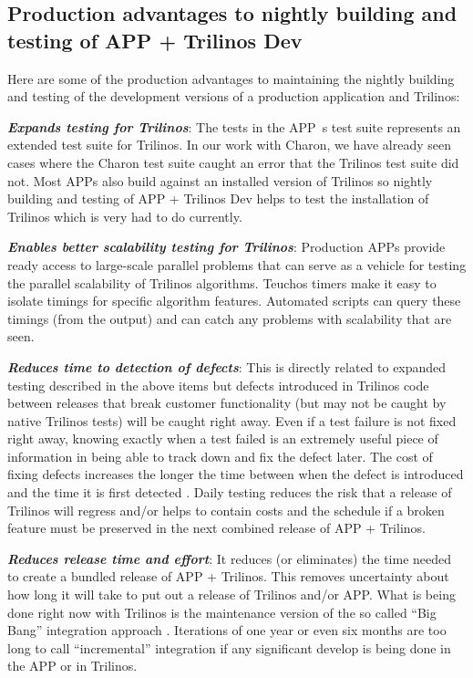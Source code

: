 \documentclass[pdf,ps2pdf,11pt]{SANDreport}
\begin{document}
%
{}\subsection{Production advantages to nightly building and testing of APP +
Trilinos Dev}
%

Here are some of the production advantages to maintaining the nightly building
and testing of the development versions of a production application and
Trilinos:

{}\textit{\textbf{Expands testing for Trilinos}}: The tests in the APP~s test
suite represents an extended test suite for Trilinos.  In our work with
Charon, we have already seen cases where the Charon test suite caught an error
that the Trilinos test suite did not.  Most APPs also build against an
installed version of Trilinos so nightly building and testing of APP +
Trilinos Dev helps to test the installation of Trilinos which is very had to
do currently.

{}\textit{\textbf{Enables better scalability testing for Trilinos}}: Production
APPs provide ready access to large-scale parallel problems that can serve as a
vehicle for testing the parallel scalability of Trilinos algorithms.  Teuchos
timers make it easy to isolate timings for specific algorithm features.
Automated scripts can query these timings (from the output) and can catch any
problems with scalability that are seen.

{}\textit{\textbf{Reduces time to detection of defects}}: This is directly related
to expanded testing described in the above items but defects introduced in
Trilinos code between releases that break customer functionality (but may not
be caught by native Trilinos tests) will be caught right away.  Even if a test
failure is not fixed right away, knowing exactly when a test failed is an
extremely useful piece of information in being able to track down and fix the
defect later.  The cost of fixing defects increases the longer the time
between when the defect is introduced and the time it is first detected
{}\cite{book:code-complete-2}.  Daily testing reduces the risk that a release
of Trilinos will regress and/or helps to contain costs and the schedule if a
broken feature must be preserved in the next combined release of APP +
Trilinos.

{}\textit{\textbf{Reduces release time and effort}}: It reduces (or eliminates)
the time needed to create a bundled release of APP + Trilinos.  This removes
uncertainty about how long it will take to put out a release of Trilinos
and/or APP.  What is being done right now with Trilinos is the maintenance
version of the so called ``Big Bang'' integration approach
{}\cite{book:code-complete-2}.  Iterations of one year or even six months are
too long to call ``incremental'' integration if any significant develop is
being done in the APP or in Trilinos.
\end{document}
